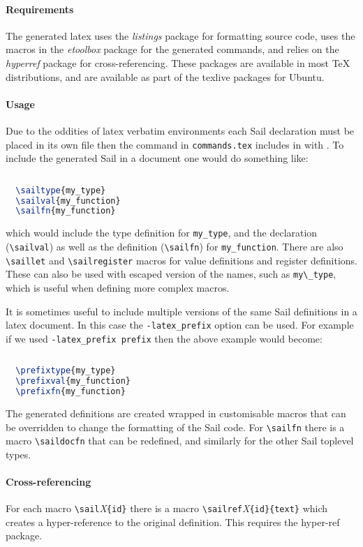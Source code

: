 \paragraph{Requirements} The generated latex uses the \emph{listings} package for formatting
source code, uses the macros in the \emph{etoolbox} package for the
generated commands, and relies on the \emph{hyperref} package for
cross-referencing. These packages are available in most TeX
distributions, and are available as part of the texlive packages for
Ubuntu.

\paragraph{Usage} Due to the oddities of latex verbatim environments each Sail
declaration must be placed in its own file then the command in
\verb+commands.tex+ includes in with \verb++. To
include the generated Sail in a document one would do something like:
\begin{lstlisting}[language=TeX]
  
  \sailtype{my_type}
  \sailval{my_function}
  \sailfn{my_function}
\end{lstlisting}
which would include the type definition for \verb+my_type+, and the
declaration (\verb+\sailval+) as well as the definition
(\verb+\sailfn+) for \verb+my_function+.  There are also
\verb+\saillet+ and \verb+\sailregister+ macros for value definitions
and register definitions.  These can also be used with escaped version
of the names, such as \verb+my\_type+, which is useful when defining
more complex macros.

It is sometimes useful to include multiple versions of the same Sail
definitions in a latex document. In this case the \verb+-latex_prefix+
option can be used. For example if we used \verb+-latex_prefix prefix+
then the above example would become:
\begin{lstlisting}[language=TeX]
  
  \prefixtype{my_type}
  \prefixval{my_function}
  \prefixfn{my_function}
\end{lstlisting}

The generated definitions are created wrapped in customisable macros
that can be overridden to change the formatting of the Sail code. For
\verb+\sailfn+ there is a macro \verb+\saildocfn+ that can be redefined,
and similarly for the other Sail toplevel types.

\paragraph{Cross-referencing} For each macro \verb+\sail+\emph{X}\verb+{id}+ there is a macro
\verb+\sailref+\emph{X}\verb+{id}{text}+ which creates a
hyper-reference to the original definition. This requires the
hyper-ref package.

